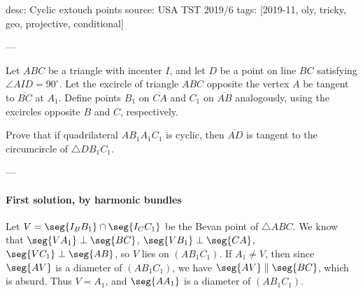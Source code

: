 desc: Cyclic extouch points
source: USA TST 2019/6
tags: [2019-11, oly, tricky, geo, projective, conditional]

---

Let $ABC$ be a triangle with incenter $I$, and let $D$ be a point on line $BC$ satisfying $\angle AID=90^\circ$. Let the excircle of triangle $ABC$ opposite the vertex $A$ be tangent to $\overline{BC}$ at $A_1$. Define points $B_1$ on $\overline{CA}$ and $C_1$ on $\overline{AB}$ analogously, using the excircles opposite $B$ and $C$, respectively.

Prove that if quadrilateral $AB_1A_1C_1$ is cyclic, then $\overline{AD}$ is tangent to the circumcircle of $\triangle DB_1C_1$.

---

\paragraph{First solution, by harmonic bundles}     Let $V=\seg{I_BB_1}\cap\seg{I_CC_1}$ be the Bevan point of $\triangle ABC$. We know that $\seg{VA_1}\perp\seg{BC}$, $\seg{VB_1}\perp\seg{CA}$, $\seg{VC_1}\perp\seg{AB}$, so $V$ lies on $(AB_1C_1)$. If $A_1\ne V$, then since $\seg{AV}$ is a diameter of $(AB_1C_1)$, we have $\seg{AV}\parallel\seg{BC}$, which is absurd. Thus $V=A_1$, and $\seg{AA_1}$ is a diameter of $(AB_1C_1)$. 
